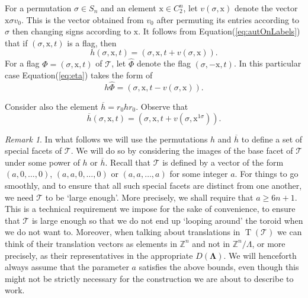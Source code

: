 \documentclass[final]{amsart}
\theoremstyle{plain}
\theoremstyle{definition}
\theoremstyle{remark}
\newtheorem{rem}[thm]{Remark}
\numberwithin{equation}{section}
\renewcommand{\{}{\lbrace}
\renewcommand{\}}{\rbrace}
\renewcommand{\bar}{\overline}
\renewcommand{\hat}{\widehat}
\newcommand{\bZ}{\mathbb{Z}}
\newcommand{\cT}{\mathcal{T}}
\newcommand{\LL}{\Lambda}
\newcommand{\bLL}{\mathbf{\Lambda}}
\newcommand{\cyvec}[1]{{\mathrm{#1}}}
\newcommand{\vx}{\cyvec{x}}
\newcommand{\cyctwo}[1][n]{ C_{2}^{#1} }
\DeclareMathOperator{\tras}{T}
\newcommand{\kng}{{h}}
\begin{document}
For a permutation $\sigma \in S_{n}$ and an element $\vx \in \cyctwo$, let $v(\sigma, \vx)$ denote the vector $\vx \sigma  v_{0}$. This is the vector obtained from $v_{0}$ after permuting its entries according to $\sigma$ then changing signs according to $\vx$. It follows from Equation\nobreakspace \textup {(\ref {eq:autOnLabels})} that if $(\sigma, \vx,  t)$ is a flag, then
\begin{equation} \label{eq:eta}
  \kng(\sigma, \vx,  t) = \left(\sigma, \vx,  t + v(\sigma, \vx)\right).
\end{equation}
For a flag $\Phi = (\sigma, \vx, t)$ of $\cT$, let $\hat{\Phi}$ denote the flag $(\sigma, -\vx, t)$.
In this particular case Equation\nobreakspace \textup {(\ref {eq:eta})} takes the form of
\begin{equation}\label{eq:antipoda}
\kng \hat{\Phi} = (\sigma, \vx, t - v(\sigma, \vx)).
\end{equation}


Consider also the element $\bar{\kng} = r_{0} \kng r_{0}$.
Observe that
\begin{equation} \label{eq:etaBar}
\bar{\kng}(\sigma, \vx,  t) = \left(\sigma, \vx,  t + v(\sigma, \vx^{1 \sigma})\right).
\end{equation}


\begin{rem}\label{rem:largeToroid} 
In what follows we will use the permutations $\kng$ and $\bar{\kng}$ to define a set of special facets of $\cT$. 
We will do so by considering the images of the base facet of $\cT$ under some power of $\kng$ or $\bar{\kng}$. 
Recall that $\cT$ is defined by a vector of the form $(a,0,\ldots,0)$, $(a,a,0,\ldots,0)$ or $(a,a,\ldots,a)$ for some integer $a$. 
For things to go smoothly, and to ensure that all such special facets are distinct from one another, we need $\cT$ to be `large enough'.
More precisely, we shall require that $a \geq 6n + 1$.
This is a technical requirement we impose for the sake of convenience, to ensure that $\cT$ is large enough so that we do not end up `looping around' the toroid when we do not want to.
Moreover, when talking about translations in $\tras(\cT)$ we can think of their translation vectors as elements in $\bZ^n$ and not in $\bZ^n/\LL$, or more precisely, as their representatives in the appropriate $D(\bLL)$.
We will henceforth always assume that the parameter $a$ satisfies the above bounds, even though this might not be strictly necessary for the construction we are about to describe to work.
\end{rem}
\end{document}
